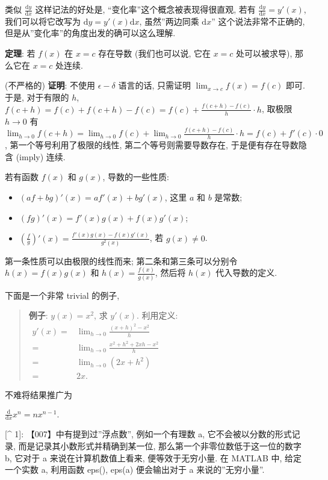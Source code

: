 类似 \(\frac{\mathrm{d}y}{\mathrm{d}x}\) 这样记法的好处是,
``变化率''这个概念被表现得很直观, 若有
\(\frac{\mathrm{d}y}{\mathrm{d}x}=y'(x)\), 我们可以将它改写为
\(\mathrm{d}y=y'(x)\mathrm{d}x\), 虽然''两边同乘 \(\mathrm{d}x\)''
这个说法非常不正确的, 但是从''变化率''的角度出发的确可以这么理解.

\textbf{定理}: 若 \(f(x)\) 在 \(x=c\) 存在导数 (我们也可以说, 它在
\(x=c\) 处可以被求导), 那么它在 \(x=c\) 处连续.

(不严格的) \textbf{证明}: 不使用 \(\epsilon - \delta\) 语言的话,
只需证明 \(\lim_{x\rightarrow c}f(x)=f(c)\) 即可. 于是, 对于有限的
\(h\), \(f(c+h)=f(c)+f(c+h)-f(c)=f(c)+\frac{f(c+h)-f(c)}{h}\cdot h\),
取极限 \(h\rightarrow0\) 有
\(\lim_{h\rightarrow0}f(c+h)=\lim_{h\rightarrow0}f(c)+\lim_{h\rightarrow0}\frac{f(c+h)-f(c)}{h}\cdot h=f(c)+f'(c)\cdot 0\),
第一个等号利用了极限的线性, 第二个等号则需要导数存在,
于是便有存在导数隐含 (imply) 连续.

若有函数 \(f(x)\) 和 \(g(x)\), 导数的一些性质:

\begin{itemize}
\tightlist
\item
  \((af+bg)'(x)=af'(x)+bg'(x)\), 这里 \(a\) 和 \(b\) 是常数;
\item
  \((fg)'(x)=f'(x)g(x)+f(x)g'(x)\);
\item
  \(\left(\frac{f}{g}\right)'(x)=\frac{f'(x)g(x)-f(x)g'(x)}{g^2(x)}\),
  若 \(g(x)\neq 0\).
\end{itemize}

第一条性质可以由极限的线性而来; 第二条和第三条可以分别令
\(h(x)=f(x)g(x)\) 和 \(h(x)=\frac{f(x)}{g(x)}\), 然后将 \(h(x)\)
代入导数的定义.

下面是一个非常 trivial 的例子,

\begin{quote}
\textbf{例子}: \(y(x)=x^2\), 求 \(y'(x)\). 利用定义:
\(\begin{aligned}y'(x)=&\lim_{h\rightarrow0}\frac{(x+h)^2-x^2}{h}\\=&\lim_{h\rightarrow0}\frac{x^2+h^2+2xh-x^2}{h}\\=&\lim_{h\rightarrow0}(2x+h^2)\\=&2x.\end{aligned}\)
\end{quote}

不难将结果推广为

\(\boxed{\frac{\mathrm{d}}{\mathrm{d}x}x^n=nx^{n-1}}.\)

{[}\^{} 1{]}: 【007】中有提到过''浮点数'', 例如一个有理数 a,
它不会被以分数的形式记录, 而是记录其小数形式并精确到某一位,
那么第一个非零位数低于这一位的数字 b, 它对于 a 来说在计算机数值上看来,
便等效于无穷小量. 在 MATLAB 中, 给定一个实数 a, 利用函数 eps(), eps(a)
便会输出对于 a 来说的''无穷小量''.
